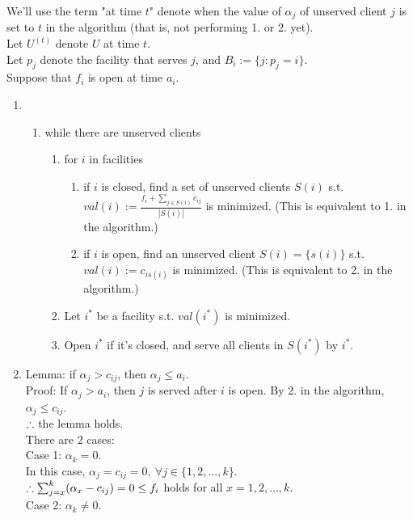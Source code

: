 \begin{pr}
We'll use the term "at time $t$" denote when the value of $\alpha_j$ of unserved client $j$ is set to $t$ in the algorithm (that is, not performing 1. or 2. yet).\\
Let $U^{(t)}$ denote $U$ at time $t$.\\
Let $p_j$ denote the facility that serves $j$, and $B_i:=\{j:p_j=i\}$.\\
Suppose that $f_i$ is open at time $a_i$.
\begin{enumerate}
\item
\begin{enumerate}
\item while there are unserved clients
\begin{enumerate}
\item for $i$ in facilities
\begin{enumerate}
\item if $i$ is closed, find a set of unserved clients $S(i)$ s.t. $val(i):=\frac{f_i+\sum_{j\in S(i)}c_{ij}}{|S(i)|}$ is minimized. (This is equivalent to 1. in the algorithm.)
\item if $i$ is open, find an unserved client $S(i)=\{s(i)\}$ s.t. $val(i):=c_{is(i)}$ is minimized. (This is equivalent to 2. in the algorithm.)
\end{enumerate}
\item Let $i^*$ be a facility s.t. $val(i^*)$ is minimized.
\item Open $i^*$ if it's closed, and serve all clients in $S(i^*)$ by $i^*$.
\end{enumerate}
\end{enumerate}
\item Lemma: if $\alpha_j>c_{ij}$, then $\alpha_j\leq a_i$.\\
Proof: If $\alpha_j>a_i$, then $j$ is served after $i$ is open. By 2. in the algorithm, $\alpha_j\leq c_{ij}$.\\
$\therefore$ the lemma holds.\\
There are $2$ cases:\\
Case 1: $\alpha_k=0$.\\
In this case, $\alpha_j=c_{ij}=0,\ \forall j\in\{1, 2, \dots, k\}$.\\
$\therefore\sum_{j=x}^k(\alpha_x-c_{ij})=0\leq f_i$ holds for all $x=1, 2, \dots, k$.\\
Case 2: $\alpha_k\neq0$.\\

\end{enumerate}
\end{pr}

